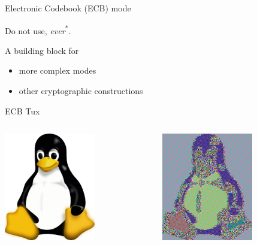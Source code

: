 \begin{frame}{Electronic Codebook (ECB) mode}
  \begin{center}
  \end{center}

  \pause
  Do not use, \emph{ever}\textsuperscript{*}.

  \pause
  A building block for
  \begin{itemize}[<+->]
    \item more complex modes
    \item other cryptographic constructions
  \end{itemize}
\end{frame}

\begin{frame}{ECB Tux}
  \begin{columns}
    \begin{column}{0.5\textwidth}
      \begin{center}
        \includegraphics[width=150px]{tux}
      \end{center}
    \end{column}
    \begin{column}{0.5\textwidth}
      \pause
      \begin{center}
        \includegraphics[width=150px]{tux_ecb}
      \end{center}
    \end{column}
  \end{columns}
\end{frame}

